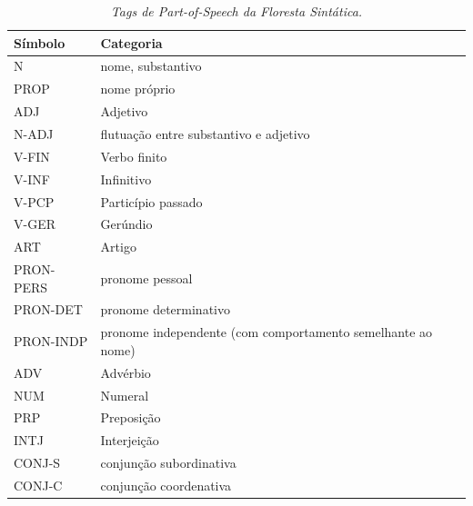 \begin{table}
   \centering
   \small
   \caption{\it Tags de Part-of-Speech da Floresta Sintática.}

    \begin{tabular}{ | p{3cm} | p{10cm} |}
      \hline
        \textbf{Símbolo} & \textbf{Categoria}\\
        \hline
        \hline

    N&nome, substantivo\\
    \hline
    PROP&nome próprio\\
    \hline
    ADJ&Adjetivo\\
    \hline
    N-ADJ&flutuação entre substantivo e adjetivo\\
    \hline
    V-FIN&Verbo finito\\
    \hline
    V-INF&Infinitivo\\
    \hline
    V-PCP&Particípio passado\\
    \hline
    V-GER&Gerúndio\\
    \hline
    ART&Artigo\\
    \hline
    PRON-PERS&pronome pessoal\\
    \hline
    PRON-DET&pronome determinativo\\
    \hline
    PRON-INDP&pronome independente (com comportamento semelhante ao nome)\\
    \hline
    ADV&Advérbio\\
    \hline
    NUM&Numeral\\
    \hline
    PRP&Preposição\\
    \hline
    INTJ&Interjeição\\
    \hline
    CONJ-S&conjunção subordinativa\\
    \hline
    CONJ-C&conjunção coordenativa\\
\hline

   \end{tabular}
   \label{tbl:floresta_sintatica_pos}
\end{table}


